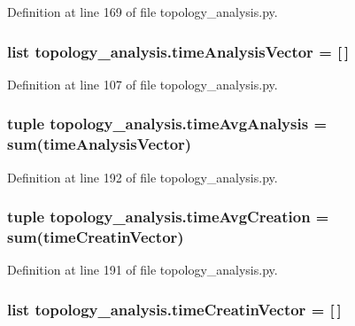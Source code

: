 Definition at line 169 of file topology\+\_\+analysis.\+py.

\hypertarget{a00159_a3ddbda333425be797470f7d058e2c8a4}{
\subsubsection[{time\+Analysis\+Vector}]{\setlength{\rightskip}{0pt plus 5cm}list topology\+\_\+analysis.\+time\+Analysis\+Vector = \mbox{[}$\,$\mbox{]}}}\label{a00159_a3ddbda333425be797470f7d058e2c8a4}


Definition at line 107 of file topology\+\_\+analysis.\+py.

\hypertarget{a00159_a0689e49982e7bedba8ac4eb5534963db}{
\subsubsection[{time\+Avg\+Analysis}]{\setlength{\rightskip}{0pt plus 5cm}tuple topology\+\_\+analysis.\+time\+Avg\+Analysis = {\bf sum}({\bf time\+Analysis\+Vector})}}\label{a00159_a0689e49982e7bedba8ac4eb5534963db}


Definition at line 192 of file topology\+\_\+analysis.\+py.

\hypertarget{a00159_a4cd61f10a5a0a8d80608e71a1fc2009c}{
\subsubsection[{time\+Avg\+Creation}]{\setlength{\rightskip}{0pt plus 5cm}tuple topology\+\_\+analysis.\+time\+Avg\+Creation = {\bf sum}({\bf time\+Creatin\+Vector})}}\label{a00159_a4cd61f10a5a0a8d80608e71a1fc2009c}


Definition at line 191 of file topology\+\_\+analysis.\+py.

\hypertarget{a00159_a0527a0989312340a402661aebc675d30}{
\subsubsection[{time\+Creatin\+Vector}]{\setlength{\rightskip}{0pt plus 5cm}list topology\+\_\+analysis.\+time\+Creatin\+Vector = \mbox{[}$\,$\mbox{]}}}\label{a00159_a0527a0989312340a402661aebc675d30}


